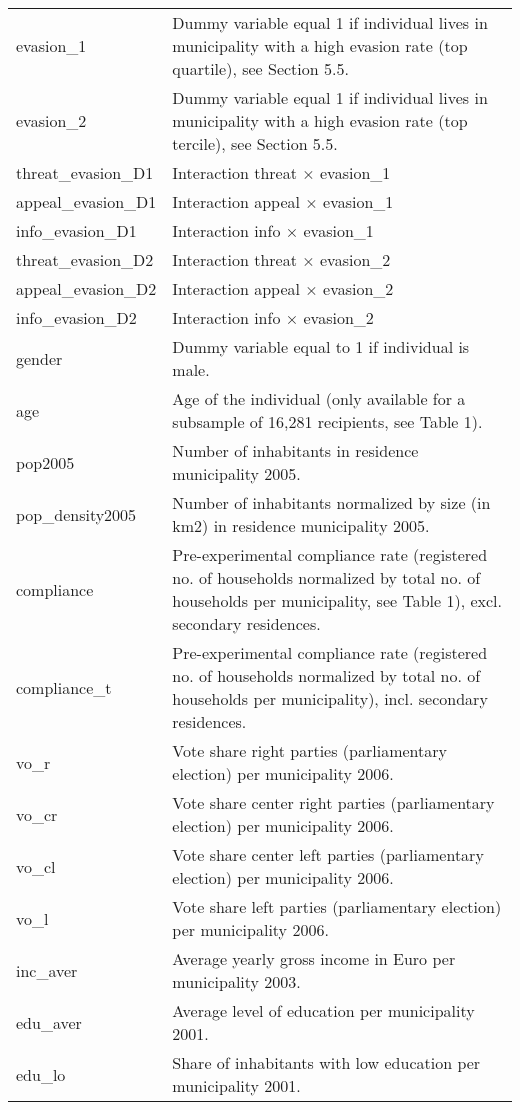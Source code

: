 \begin{longtable}[t]{l>{\raggedright\arraybackslash}p{30em}}
evasion\_1 & Dummy variable equal 1 if individual lives in municipality with a high evasion rate (top quartile), see Section 5.5.\\
evasion\_2 & Dummy variable equal 1 if individual lives in municipality with a high evasion rate (top tercile), see Section 5.5.\\
threat\_evasion\_D1 & Interaction threat × evasion\_1\\
appeal\_evasion\_D1 & Interaction appeal × evasion\_1\\
info\_evasion\_D1 & Interaction info × evasion\_1\\
\addlinespace
threat\_evasion\_D2 & Interaction threat × evasion\_2\\
appeal\_evasion\_D2 & Interaction appeal × evasion\_2\\
info\_evasion\_D2 & Interaction info × evasion\_2\\
gender & Dummy variable equal to 1 if individual is male.\\
age & Age of the individual (only available for a subsample of 16,281 recipients, see Table 1).\\
\addlinespace
pop2005 & Number of inhabitants in residence municipality 2005.\\
pop\_density2005 & Number of inhabitants normalized by size (in km2) in residence municipality 2005.\\
compliance & Pre-experimental compliance rate (registered no. of households normalized by total no. of households per municipality, see Table 1), excl. secondary residences.\\
compliance\_t & Pre-experimental compliance rate (registered no. of households normalized by total no. of households per municipality), incl. secondary residences.\\
vo\_r & Vote share right parties (parliamentary election) per municipality 2006.\\
\addlinespace
vo\_cr & Vote share center right parties (parliamentary election) per municipality 2006.\\
vo\_cl & Vote share center left parties (parliamentary election) per municipality 2006.\\
vo\_l & Vote share left parties (parliamentary election) per municipality 2006.\\
inc\_aver & Average yearly gross income in Euro per municipality 2003.\\
edu\_aver & Average level of education per municipality 2001.\\
\addlinespace
edu\_lo & Share of inhabitants with low education per municipality 2001.\\

\end{longtable}

